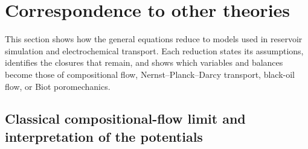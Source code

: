 \section{Correspondence to other theories}
\label{sec:correspondence_to_other_theories}

This section shows how the general equations reduce to models used in reservoir
simulation and electrochemical transport.  Each reduction states its
assumptions, identifies the closures that remain, and shows which variables and
balances become those of compositional flow, Nernst--Planck--Darcy transport,
black-oil flow, or Biot poromechanics.

\subsection{Classical compositional-flow limit and interpretation of the potentials}
\label{sec:classical_compositional_limit}

